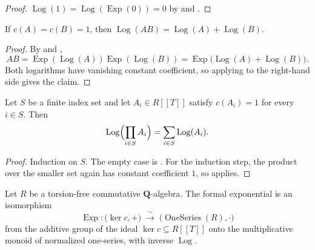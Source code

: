 \begin{proof}
  \leanok
  $\operatorname{Log}(1)=\operatorname{Log}(\operatorname{Exp}(0))=0$ by
   and .
\end{proof}

\begin{proposition}
  \label{prop:weil-log-mul}
  \leanok

  If $c(A)=c(B)=1$, then
  $\operatorname{Log}(AB)=\operatorname{Log}(A)+\operatorname{Log}(B)$.
\end{proposition}

\begin{proof}
  \leanok
  By  and ,
  \[
    AB=\operatorname{Exp}(\operatorname{Log}(A))
       \operatorname{Exp}(\operatorname{Log}(B))
      =\operatorname{Exp}\bigl(\operatorname{Log}(A)+\operatorname{Log}(B)\bigr).
  \]
  Both logarithms have vanishing constant coefficient, so applying
   to the right-hand side gives the claim.
\end{proof}

\begin{proposition}
  \label{prop:weil-log-prod}
  \leanok

  Let $S$ be a finite index set and let $A_i\in R[[T]]$ satisfy $c(A_i)=1$
  for every $i\in S$.  Then
  \[
    \operatorname{Log}\Bigl(\prod_{i\in S}A_i\Bigr)
      =\sum_{i\in S}\operatorname{Log}(A_i).
  \]
\end{proposition}

\begin{proof}
  \leanok
  Induction on $S$.  The empty case is .  For the
  induction step, the product over the smaller set again has constant
  coefficient $1$, so  applies.
\end{proof}

\begin{theorem}
  \label{thm:weil-exp-log-equiv}
  \leanok

  Let $R$ be a torsion-free commutative $\mathbf Q$-algebra.  The formal
  exponential is an isomorphism
  \[
    \operatorname{Exp}\colon
      \bigl(\ker c,+\bigr)\;\xrightarrow{\ \sim\ }\;
      \bigl(\operatorname{OneSeries}(R),\cdot\bigr)
  \]
  from the additive group of the ideal $\ker c\subseteq R[[T]]$ onto the
  multiplicative monoid of normalized one-series, with inverse
  $\operatorname{Log}$.
\end{theorem}

